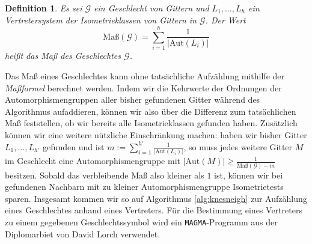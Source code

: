 \documentclass[12pt,a4paper,halfparskip,headsepline,bibtotocnumbered]{scrreprt}
\theoremstyle{nummermitklammern}
\newtheorem{definition}[defsatzusw]{Definition}
\theoremstyle{nonumberbreak}
\newcommand{\Aut}{\text{Aut}}
\begin{document}
\begin{framed}
	\begin{definition}
		Es sei $\mathcal{G}$ ein Geschlecht von Gittern und $L_1, \dots, L_h$ ein Vertretersystem der Isometrieklassen von Gittern in $\mathcal{G}$. Der Wert
		\begin{equation*}
			\text{Maß}(\mathcal{G}) = \sum_{i=1}^h \frac{1}{\vert \Aut(L_i) \vert}
		\end{equation*}
		heißt das \textit{Maß} des Geschlechtes $\mathcal{G}$.
	\end{definition}
\end{framed}

Das Maß eines Geschlechtes kann ohne tatsächliche Aufzählung mithilfe der \textit{Maßformel} berechnet werden. Indem wir die Kehrwerte der Ordnungen der Automorphismengruppen aller bisher gefundenen Gitter während des Algorithmus aufaddieren, können wir also über die Differenz zum tatsächlichen Maß feststellen, ob wir bereits alle Isometrieklassen gefunden haben. Zusätzlich können wir eine weitere nützliche Einschränkung machen: haben wir bisher Gitter $L_1, \dots, L_{h'}$ gefunden und ist $m := \sum_{i=1}^{h'} \frac{1}{\vert \Aut(L_i) \vert}$, so muss jedes weitere Gitter $M$ im Geschlecht eine Automorphismengruppe mit $\vert \Aut(M) \vert \geq \frac{1}{\text{Maß}(\mathcal{G}) - m}$ besitzen. Sobald das verbleibende Maß also kleiner als $1$ ist, können wir bei gefundenen Nachbarn mit zu kleiner Automorphismengruppe Isometrietests sparen. Insgesamt kommen wir so auf Algorithmus \eqref{alg:knesneigh} zur Aufzählung eines Geschlechtes anhand eines Vertreters. Für die Bestimmung eines Vertreters zu einem gegebenen Geschlechtssymbol wird ein \texttt{MAGMA}-Programm aus der Diplomarbiet von David Lorch \cite{lorch} verwendet.
\end{document}

